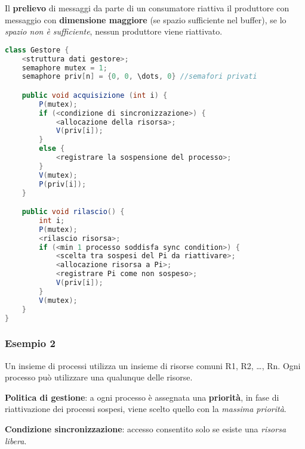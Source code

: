 Il \textbf{prelievo} di messaggi da parte di un consumatore riattiva il produttore con messaggio con \textbf{dimensione maggiore} (se spazio sufficiente nel buffer), se lo \textit{spazio non è sufficiente}, nessun produttore viene riattivato.

\begin{lstlisting}[language=java]
class Gestore {
    <struttura dati gestore>;
    semaphore mutex = 1;
    semaphore priv[n] = {0, 0, \dots, 0} //semafori privati

    public void acquisizione (int i) {
        P(mutex);
        if (<condizione di sincronizzazione>) {
            <allocazione della risorsa>;
            V(priv[i]);
        }
        else {
            <registrare la sospensione del processo>;
        }
        V(mutex);
        P(priv[i]);
    }

    public void rilascio() {
        int i;
        P(mutex);
        <rilascio risorsa>;
        if (<min 1 processo soddisfa sync condition>) {
            <scelta tra sospesi del Pi da riattivare>;
            <allocazione risorsa a Pi>;
            <registrare Pi come non sospeso>;
            V(priv[i]);
        }
        V(mutex);
    }
}
\end{lstlisting}

\subsubsection{Esempio 2}
Un insieme di processi utilizza un insieme di risorse comuni R1, R2, \dots, Rn. Ogni processo può utilizzare una qualunque delle risorse.

\textbf{Politica di gestione}: a ogni processo è assegnata una \textbf{priorità}, in fase di riattivazione dei processi sospesi, viene scelto quello con la \textit{massima priorità}.

\textbf{Condizione sincronizzazione}: accesso consentito solo se esiste una \textit{risorsa libera}.










































































